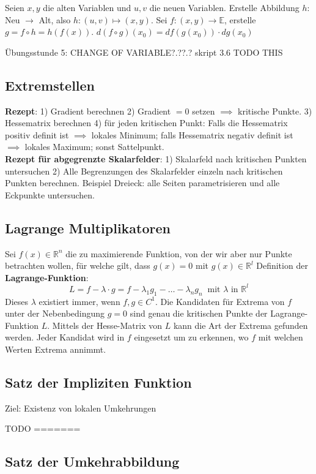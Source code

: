 Seien $x, y$ die alten Variablen und $u, v$ die neuen Variablen. Erstelle Abbildung $h:$ Neu $\to$ Alt, also $h: (u, v) \mapsto (x, y)$. Sei $f: (x, y) \to \mathbb{E}$, erstelle $g = f \circ h = h(f(x))$. $d (f \circ g) (x_0) = df(g(x_0)) \cdot dg(x_0)$

Übungsstunde 5: CHANGE OF VARIABLE?.??.? skript 3.6 TODO THIS

\subsection{Extremstellen}

\textbf{Rezept}: 1) Gradient berechnen 2) Gradient $=0$ setzen $\implies$ kritische Punkte. 3) Hessematrix berechnen 4) für jeden kritischen Punkt: Falls die Hessematrix positiv definit ist $\implies$ lokales Minimum; falls Hessematrix negativ definit ist $\implies$ lokales Maximum; sonst Sattelpunkt.\\

\textbf{Rezept für abgegrenzte Skalarfelder}: 1) Skalarfeld nach kritischen Punkten untersuchen 2) Alle Begrenzungen des Skalarfelder einzeln nach kritischen Punkten berechnen. Beispiel Dreieck: alle Seiten parametrisieren und alle Eckpunkte untersuchen.

\subsection{Lagrange Multiplikatoren}
Sei $f(x) \in \mathbb{R}^{n}$ die zu maximierende Funktion, von der wir aber nur Punkte
betrachten wollen, für welche gilt, dass $g(x) = 0$ mit $g(x) \in \mathbb{R}^{l}$
Definition der \textbf{Lagrange-Funktion}:
\[ L = f-\lambda \cdot g = f - \lambda_{1} g_{1} - \ldots - \lambda_{n}g_{n} ~ \text{ mit $\lambda$ in } \mathbb{R}^{l} \]
Dieses $\lambda$ existiert immer, wenn $f, g \in C^{1}$.
Die Kandidaten für Extrema von $f$ unter der Nebenbedingung $g = 0$ sind genau die
kritischen Punkte der Lagrange-Funktion $L$. Mittels der Hesse-Matrix von $L$
kann die Art der Extrema gefunden werden. Jeder Kandidat wird in $f$ eingesetzt
um zu erkennen, wo $f$ mit welchen Werten Extrema annimmt.

\subsection{Satz der Impliziten Funktion}
Ziel: Existenz von lokalen Umkehrungen

TODO
=======
\subsection{Satz der Umkehrabbildung}

